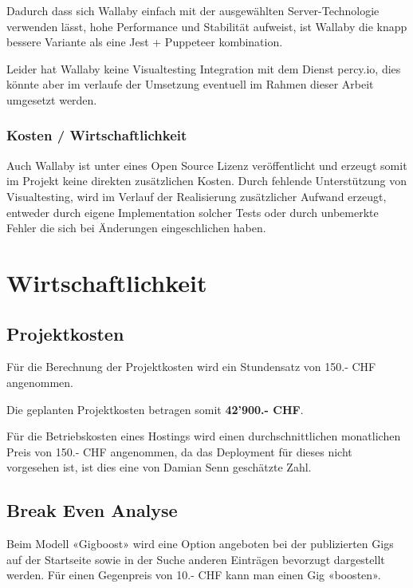 Dadurch dass sich Wallaby einfach mit der ausgewählten Server-Technologie
verwenden lässt, hohe Performance und Stabilität aufweist, ist Wallaby die
knapp bessere Variante als eine Jest + Puppeteer kombination.

Leider hat Wallaby keine Visualtesting Integration mit dem Dienst percy.io,
dies könnte aber im verlaufe der Umsetzung eventuell im Rahmen dieser Arbeit
umgesetzt werden.

\subsubsection{Kosten / Wirtschaftlichkeit}\label{WallabyPercy}

Auch Wallaby ist unter eines Open Source Lizenz veröffentlicht und erzeugt
somit im Projekt keine direkten zusätzlichen Kosten. Durch fehlende
Unterstützung von Visualtesting, wird im Verlauf der Realisierung zusätzlicher
Aufwand erzeugt, entweder durch eigene Implementation solcher Tests oder durch
unbemerkte Fehler die sich bei Änderungen eingeschlichen haben.

\clearpage
\section{Wirtschaftlichkeit}\label{wirtschaftlichkeit}

\subsection{Projektkosten}

Für die Berechnung der Projektkosten wird ein Stundensatz von 150.- CHF angenommen.



\noindent
Die geplanten Projektkosten betragen somit \textbf{42'900.- CHF}.



Für die Betriebskosten eines Hostings wird einen durchschnittlichen monatlichen
Preis von 150.- CHF angenommen, da das Deployment für dieses nicht vorgesehen
ist, ist dies eine von Damian Senn geschätzte Zahl.

\clearpage
\subsection{Break Even Analyse}\label{break-even-analyse}

Beim Modell «Gigboost» wird eine Option angeboten bei der publizierten Gigs auf
der Startseite sowie in der Suche anderen Einträgen bevorzugt dargestellt
werden. Für einen Gegenpreis von 10.- CHF kann man einen Gig «boosten».

